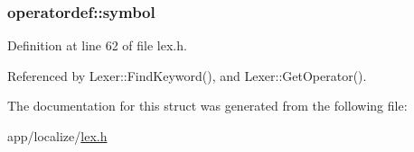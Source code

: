 \subsubsection[{\texorpdfstring{symbol}{symbol}}]{ operatordef\+::symbol}\hypertarget{structoperatordef_a32edc0834e7c84d88c7e94240b922dc1}{}\label{structoperatordef_a32edc0834e7c84d88c7e94240b922dc1}


Definition at line 62 of file lex.\+h.



Referenced by Lexer\+::\+Find\+Keyword(), and Lexer\+::\+Get\+Operator().



The documentation for this struct was generated from the following file\+:\begin{DoxyCompactItemize}
\item 
app/localize/\hyperlink{lex_8h}{lex.\+h}\end{DoxyCompactItemize}
